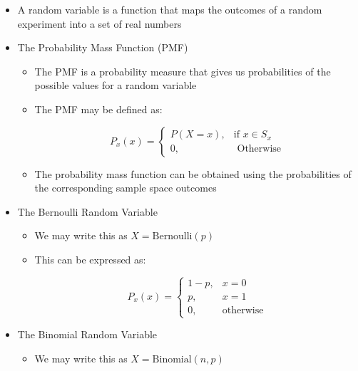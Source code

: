 \begin{itemize}

  \item A random variable is a function that maps the outcomes of a random experiment into a set of real numbers

  \item The Probability Mass Function (PMF)

    \begin{itemize}

      \item The PMF is a probability measure that gives us probabilities of the possible values for a random variable

      \item The PMF may be defined as:

        $$P_x(x)=\left\{ \begin{array}{ll} P(X=x), & \text{if }x\in S_x\\ 0, & \text{ Otherwise}\end{array}$$

      \item The probability mass function can be obtained using the probabilities of the corresponding sample space outcomes

    \end{itemize}

  \item The Bernoulli Random Variable

    \begin{itemize}

      \item We may write this as $X=\text{Bernoulli}(p)$

      \item This can be expressed as:

        $$P_x(x)=\left\{ \begin{array}{ll} 1-p,&x=0\\p,&x=1\\0,&\text{otherwise}\end{array}$$

    \end{itemize}

  \item The Binomial Random Variable

    \begin{itemize}

      \item We may write this as $X=\text{Binomial}(n,p)$


\end{itemize}
\end{itemize}
